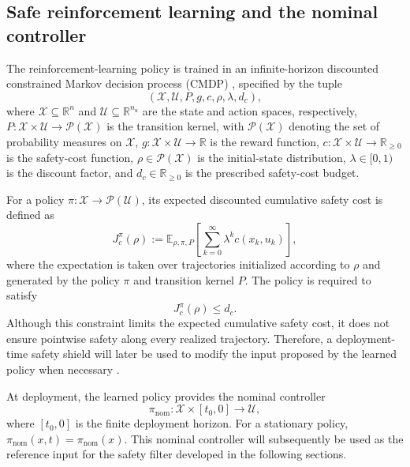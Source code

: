 \documentclass[letterpaper,10pt,conference]{ieeeconf}
\newcommand{\R}{\mathbb{R}}
\newcommand{\xv}{x}
\newcommand{\Uv}{\mathcal{U}}
\newcommand{\Xrl}{\mathcal{X}}
\begin{document}
\subsection{Safe reinforcement learning and the nominal controller}

The reinforcement-learning policy is trained in an infinite-horizon discounted
constrained Markov decision process (CMDP)
\cite{altman1999cmdp,achiam2017cpo,tessler2019rcpo}, specified by the tuple
\begin{equation}
    (\Xrl,\Uv,P,g,c,\rho,\lambda,d_c),
    \label{eq:cmdp_tuple}
\end{equation}
where $\Xrl\subseteq\R^n$ and $\Uv\subseteq\R^{n_u}$ are the state and action
spaces, respectively, $P:\Xrl\times\Uv\to\mathcal{P}(\Xrl)$ is the transition
kernel, with $\mathcal{P}(\Xrl)$ denoting the set of probability measures on
$\Xrl$, $g:\Xrl\times\Uv\to\R$ is the reward function,
$c:\Xrl\times\Uv\to\R_{\ge0}$ is the safety-cost function,
$\rho\in\mathcal{P}(\Xrl)$ is the initial-state distribution,
$\lambda\in[0,1)$ is the discount factor, and $d_c\in\R_{\ge0}$ is the
prescribed safety-cost budget.

For a policy $\pi:\Xrl\to\mathcal{P}(\Uv)$, its expected discounted cumulative
safety cost is defined as
\begin{equation}
    J_c^\pi(\rho)
    :=
    \mathbb{E}_{\rho,\pi,P}
    \left[
        \sum_{k=0}^{\infty}\lambda^k c(x_k,u_k)
    \right],
    \label{eq:cmdp_cost}
\end{equation}
where the expectation is taken over trajectories initialized according to
$\rho$ and generated by the policy $\pi$ and transition kernel $P$. The policy
is required to satisfy
\begin{equation}
    J_c^\pi(\rho)\le d_c .
    \label{eq:cmdp_constraint}
\end{equation}
Although this constraint limits the expected cumulative safety cost, it does
not ensure pointwise safety along every realized trajectory. Therefore, a
deployment-time safety shield will later be used to modify the input proposed
by the learned policy when necessary
\cite{alshiekh2018safe,fisac2019general}.

At deployment, the learned policy provides the nominal controller
\begin{equation}
    \pi_{\mathrm{nom}}:\Xrl\times[t_0,0]\to\Uv,
    \label{eq:nominal_policy}
\end{equation}
where $[t_0,0]$ is the finite deployment horizon. For a stationary policy,
$\pi_{\mathrm{nom}}(\xv,t)=\pi_{\mathrm{nom}}(\xv)$. This nominal controller
will subsequently be used as the reference input for the safety filter
developed in the following sections.
\end{document}
